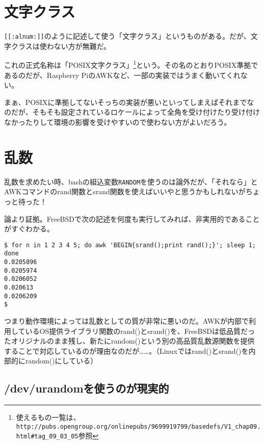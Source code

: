 \section{文字クラス}
\label{allenvs:letterclass}

\verb|[[:alnum:]]|のように記述して使う「文字クラス」というものがある。だが、文字クラスは使わない方が無難だ。

これの正式名称は「POSIX文字クラス」\footnote{使えるもの一覧は、\verb|http://pubs.opengroup.org/onlinepubs/9699919799/basedefs/V1_chap09.html#tag_09_03_05|参照}という。その名のとおりPOSIX準拠であるのだが、Raspberry PiのAWKなど、一部の実装ではうまく動いてくれない。

まぁ、POSIXに準拠してないそっちの実装が悪いといってしまえばそれまでなのだが、そもそも設定されているロケールによって全角を受け付けたり受け付けなかったりして環境の影響を受けやすいので使わない方がよいだろう。

\section{乱数}
\label{allenvs:random_number}

乱数を求めたい時、bashの組込変数\verb|RANDOM|を使うのは論外だが、「それなら」とAWKコマンドのrand関数とsrand関数を使えばいいやと思うかもしれないがちょっと待った！

論より証拠。FreeBSDで次の記述を何度も実行してみれば、非実用的であることがすぐわかる。

\begin{screen}
	\verb|$ for n in 1 2 3 4 5; do awk 'BEGIN{srand();print rand();}'; sleep 1; done| \return \\
	\verb|0.0205896| \\
	\verb|0.0205974| \\
	\verb|0.0206052| \\
	\verb|0.020613| \\
	\verb|0.0206209| \\
	\verb|$ |
\end{screen}

つまり動作環境によっては乱数としての質が非常に悪いのだ。AWKが内部で利用しているOS提供ライブラリ関数のrand()とsrand()を、FreeBSDは低品質だったオリジナルのまま残し、新たにrandom()という別の高品質乱数源関数を提供することで対応しているのが理由なのだが……。（Linuxではrand()とsrand()を内部的にrandom()にしている）

\subsection*{/dev/urandomを使うのが現実的}

